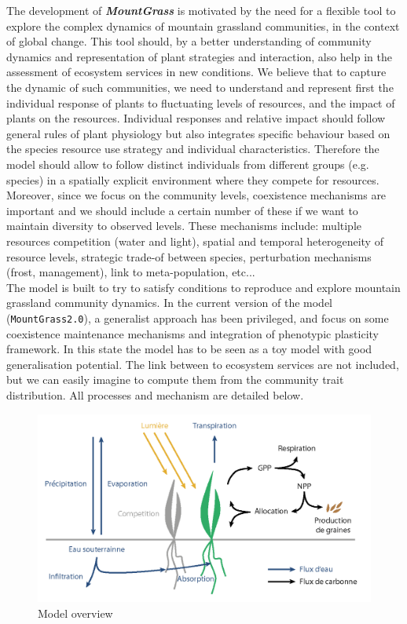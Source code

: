 \documentclass[a4paper,twoside, justified,marginals=raggedright, nobib]{tufte-handout}
\newcommand{\model}{\textit{\textbf{MountGrass }}}
\newcommand{\version}{\texttt{MountGrass2.0}}
\begin{document}
The development of \model is motivated by the need for a flexible tool to explore the complex dynamics of mountain grassland communities, in the context of global change. This tool should, by a better understanding of community dynamics and representation of plant strategies and interaction, also help in the assessment of ecosystem services in new conditions. We believe that to capture the dynamic of such communities, we need to understand and represent first the individual response of plants  to fluctuating levels of resources, and the impact of plants on the resources. Individual responses and relative impact should follow general rules of plant physiology but also integrates specific behaviour based on the species resource use strategy and individual characteristics. Therefore the model should allow to follow distinct individuals from different groups (e.g. species) in a spatially explicit environment where they compete for resources.\\
\indent Moreover, since we focus on the community levels, coexistence mechanisms are important and we should include a certain number of these if we want to maintain diversity to observed levels. These mechanisms include: multiple resources competition (water and light), spatial and temporal heterogeneity of resource levels, strategic trade-of between species, perturbation mechanisms (frost, management), link  to meta-population, etc...\\
\indent The model is built to try to satisfy conditions to reproduce and explore mountain grassland community dynamics. In the current version of the model (\version), a generalist approach has been privileged, and focus on some coexistence maintenance mechanisms and integration of phenotypic plasticity framework. In this state the model has to be seen as a toy model with good generalisation potential. The link between to ecosystem services are not included, but we can easily imagine to compute them from the community trait distribution. All processes and mechanism are detailed below.

\begin{figure}
\includegraphics{./Figures/overview_model_t.png}
\caption{Model overview}
\end{figure}
\end{document}
